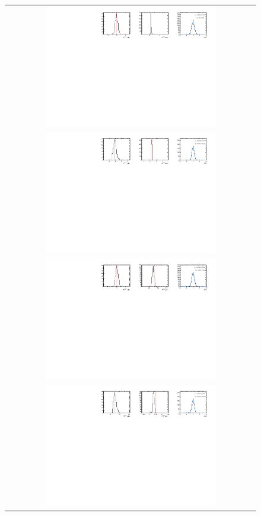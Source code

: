 \begin{figure}
\begin{tabular}{c}
\includegraphics[width=0.7\textwidth]{ANA_resources/Plots/Data_fit/FitterBias//A_signal_pipi_run1.pdf} \\
\includegraphics[width=0.7\textwidth]{ANA_resources/Plots/Data_fit/FitterBias//R_signal_pipi_run1.pdf} \\
\includegraphics[width=0.7\textwidth]{ANA_resources/Plots/Data_fit/FitterBias//A_Bs_pipi_run1.pdf} \\
\includegraphics[width=0.7\textwidth]{ANA_resources/Plots/Data_fit/FitterBias//R_ds_pipi_run1.pdf} \\

\end{tabular}
\end{figure}
